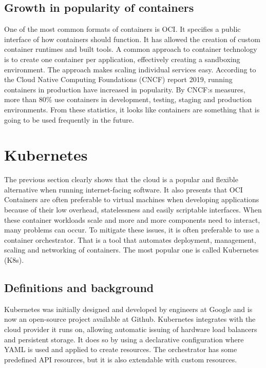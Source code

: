 \subsection{Growth in popularity of containers}
One of the most common formats of containers is OCI\cite{oci_spec}. It specifies a public interface of how containers should function. It has allowed the creation of custom container runtimes and built tools. A common approach to container technology is to create one container per application, effectively creating a sandboxing environment. The approach makes scaling individual services easy. According to the Cloud Native Computing Foundations (CNCF) report 2019\cite{cncf_report}, running containers in production have increased in popularity. By CNCF:s measures, more than 80\% use containers in development, testing, staging and production environments. From these statistics, it looks like containers are something that is going to be used frequently in the future. 





\section{Kubernetes} %
The previous section clearly shows that the cloud is a popular and flexible alternative when running internet-facing software. It also presents that OCI Containers are often preferable to virtual machines when developing applications because of their low overhead, statelessness and easily scriptable interfaces. When these container workloads scale and more and more components need to interact, many problems can occur. To mitigate these issues, it is often preferable to use a container orchestrator\cite{redhat_orchestrator}. That is a tool that automates deployment, management, scaling and networking of containers. The most popular one is called Kubernetes (K8s)\cite{orchestor_popularity}.
\subsection{Definitions and background}
Kubernetes was initially designed and developed by engineers at Google\cite{redhat_orchestrator} and is now an open-source project available at Github\cite{github_kubernetes}. Kubernetes integrates with the cloud provider it runs on, allowing automatic issuing of hardware load balancers and persistent storage. It does so by using a declarative configuration\cite{k8s_docs} where YAML is used and applied to create resources. The orchestrator has some predefined API resources, but it is also extendable with custom resources. 

